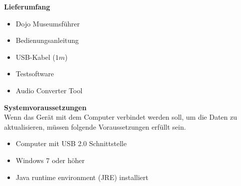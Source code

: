 \textbf{Lieferumfang}

\begin{itemize}
\item Dojo Museumsführer
\end{itemize}
\begin{itemize}
\item Bedienungsanleitung
\end{itemize}
\begin{itemize}
\item USB-Kabel ($1m$)
\end{itemize}
\begin{itemize}
\item Testsoftware
\end{itemize}
\begin{itemize}
\item Audio Converter Tool
\end{itemize}
\textbf{Systemvoraussetzungen}
\\[4mm]
Wenn das Gerät mit dem Computer verbindet werden soll, um die Daten zu aktualisieren, müssen folgende Voraussetzungen erfüllt sein.
\begin{itemize}
\item Computer mit USB 2.0 Schnittstelle
\end{itemize}
\begin{itemize}
\item Windows 7 oder höher
\end{itemize}
\begin{itemize}
\item Java runtime environment (JRE) installiert
\end{itemize}